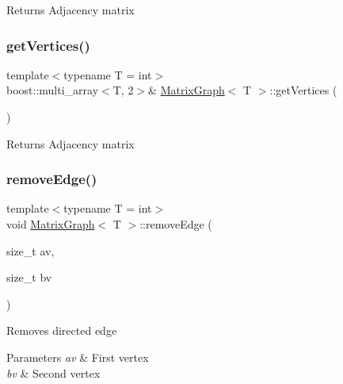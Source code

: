 \begin{DoxyReturn}{Returns}
Adjacency matrix 
\end{DoxyReturn}
\mbox{\label{class_matrix_graph_a4775ce045cd24d6ec81755fc571700ea}} 
\subsubsection{\texorpdfstring{get\+Vertices()}{getVertices()}}
{\footnotesize\ttfamily template$<$typename T = int$>$ \\
boost\+::multi\+\_\+array$<$T, 2$>$\& \hyperlink{class_matrix_graph}{Matrix\+Graph}$<$ T $>$\+::get\+Vertices (\begin{DoxyParamCaption}{ }\end{DoxyParamCaption})\hspace{0.3cm}{\ttfamily [inline]}}

\begin{DoxyReturn}{Returns}
Adjacency matrix 
\end{DoxyReturn}
\mbox{\label{class_matrix_graph_af100d2512c1a8328a792963acff74ef3}} 
\subsubsection{\texorpdfstring{remove\+Edge()}{removeEdge()}}
{\footnotesize\ttfamily template$<$typename T = int$>$ \\
void \hyperlink{class_matrix_graph}{Matrix\+Graph}$<$ T $>$\+::remove\+Edge (\begin{DoxyParamCaption}\item[{size\+\_\+t}]{av,  }\item[{size\+\_\+t}]{bv }\end{DoxyParamCaption})\hspace{0.3cm}{\ttfamily [inline]}}

Removes directed edge 
\begin{DoxyParams}{Parameters}
{\em av} & First vertex \\
\hline
{\em bv} & Second vertex \\
\hline
\end{DoxyParams}
\mbox{\label{class_matrix_graph_acc5d5c603987bc7a00fc11d37f1edd83}} 
